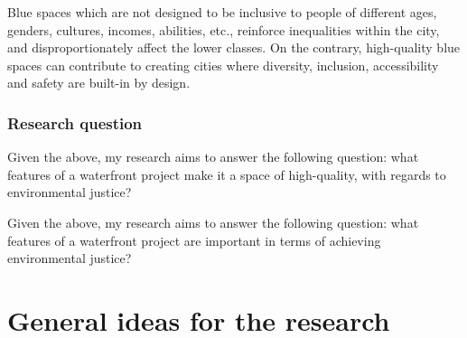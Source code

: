 \documentclass{article}
\begin{document}
Blue spaces which are not designed to be inclusive to people of different ages, genders, cultures, incomes, abilities, etc., reinforce inequalities within the city, and disproportionately affect the lower classes. On the contrary, high-quality blue spaces can contribute to creating cities where diversity, inclusion, accessibility and safety are built-in by design.

\subsubsection{Research question}

Given the above, my research aims to answer the following question: what features of a waterfront project make it a space of high-quality, with regards to environmental justice?


Given the above, my research aims to answer the following question: what features of a waterfront project are important in terms of achieving environmental justice?

\section{General ideas for the research}
\end{document}
